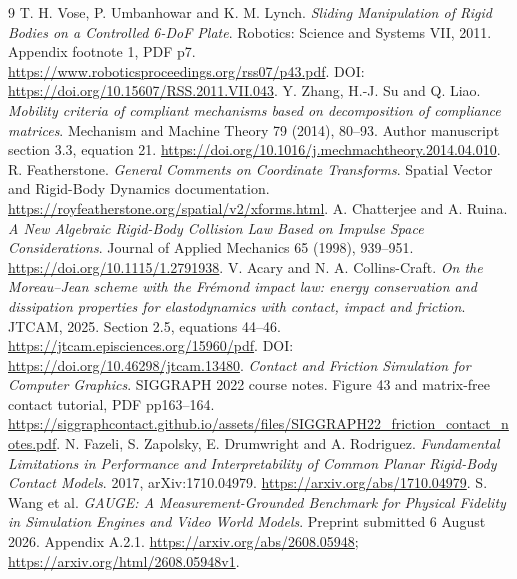 \documentclass[11pt,a4paper]{article}
\begin{document}
\begin{thebibliography}{9}
 T. H. Vose, P. Umbanhowar and K. M. Lynch. \emph{Sliding Manipulation of Rigid Bodies on a Controlled 6-DoF Plate}. Robotics: Science and Systems VII, 2011. Appendix footnote 1, PDF p7. \url{https://www.roboticsproceedings.org/rss07/p43.pdf}. DOI: \url{https://doi.org/10.15607/RSS.2011.VII.043}.
 Y. Zhang, H.-J. Su and Q. Liao. \emph{Mobility criteria of compliant mechanisms based on decomposition of compliance matrices}. Mechanism and Machine Theory 79 (2014), 80--93. Author manuscript section 3.3, equation 21. \url{https://doi.org/10.1016/j.mechmachtheory.2014.04.010}.
 R. Featherstone. \emph{General Comments on Coordinate Transforms}. Spatial Vector and Rigid-Body Dynamics documentation. \url{https://royfeatherstone.org/spatial/v2/xforms.html}.
 A. Chatterjee and A. Ruina. \emph{A New Algebraic Rigid-Body Collision Law Based on Impulse Space Considerations}. Journal of Applied Mechanics 65 (1998), 939--951. \url{https://doi.org/10.1115/1.2791938}.
 V. Acary and N. A. Collins-Craft. \emph{On the Moreau--Jean scheme with the Fr\'emond impact law: energy conservation and dissipation properties for elastodynamics with contact, impact and friction}. JTCAM, 2025. Section 2.5, equations 44--46. \url{https://jtcam.episciences.org/15960/pdf}. DOI: \url{https://doi.org/10.46298/jtcam.13480}.
 \emph{Contact and Friction Simulation for Computer Graphics}. SIGGRAPH 2022 course notes. Figure 43 and matrix-free contact tutorial, PDF pp163--164. \url{https://siggraphcontact.github.io/assets/files/SIGGRAPH22_friction_contact_notes.pdf}.
 N. Fazeli, S. Zapolsky, E. Drumwright and A. Rodriguez. \emph{Fundamental Limitations in Performance and Interpretability of Common Planar Rigid-Body Contact Models}. 2017, arXiv:1710.04979. \url{https://arxiv.org/abs/1710.04979}.
 S. Wang et al. \emph{GAUGE: A Measurement-Grounded Benchmark for Physical Fidelity in Simulation Engines and Video World Models}. Preprint submitted 6 August 2026. Appendix A.2.1. \url{https://arxiv.org/abs/2608.05948}; \url{https://arxiv.org/html/2608.05948v1}.
\end{thebibliography}
\end{document}
